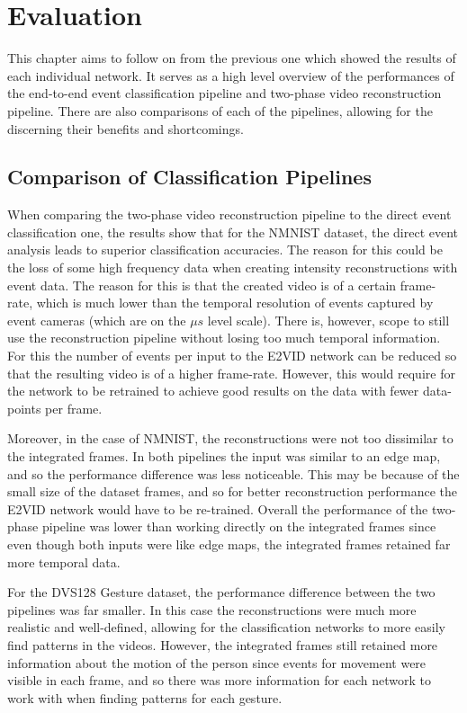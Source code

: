 \chapter{Evaluation} \label{chap:evaluation}

This chapter aims to follow on from the previous one which showed the results of each individual network. It serves as a high level overview of the performances of the end-to-end event classification pipeline and two-phase video reconstruction pipeline. There are also comparisons of each of the pipelines, allowing for the discerning their benefits and shortcomings.

\section{Comparison of Classification Pipelines}

When comparing the two-phase video reconstruction pipeline to the direct event classification one, the results show that for the NMNIST dataset, the direct event analysis leads to superior classification accuracies. The reason for this could be the loss of some high frequency data when creating intensity reconstructions with event data. The reason for this is that the created video is of a certain frame-rate, which is much lower than the temporal resolution of events captured by event cameras (which are on the $ \mu s $ level scale). There is, however, scope to still use the reconstruction pipeline without losing too much temporal information. For this the number of events per input to the E2VID network can be reduced so that the resulting video is of a higher frame-rate. However, this would require for the network to be retrained to achieve good results on the data with fewer data-points per frame.

Moreover, in the case of NMNIST, the reconstructions were not too dissimilar to the integrated frames. In both pipelines the input was similar to an edge map, and so the performance difference was less noticeable. This may be because of the small size of the dataset frames, and so for better reconstruction performance the E2VID network would have to be re-trained. Overall the performance of the two-phase pipeline was lower than working directly on the integrated frames since even though both inputs were like edge maps, the integrated frames retained far more temporal data.

For the DVS128 Gesture dataset, the performance difference between the two pipelines was far smaller. In this case the reconstructions were much more realistic and well-defined, allowing for the classification networks to more easily find patterns in the videos. However, the integrated frames still retained more information about the motion of the person since events for movement were visible in each frame, and so there was more information for each network to work with when finding patterns for each gesture.

